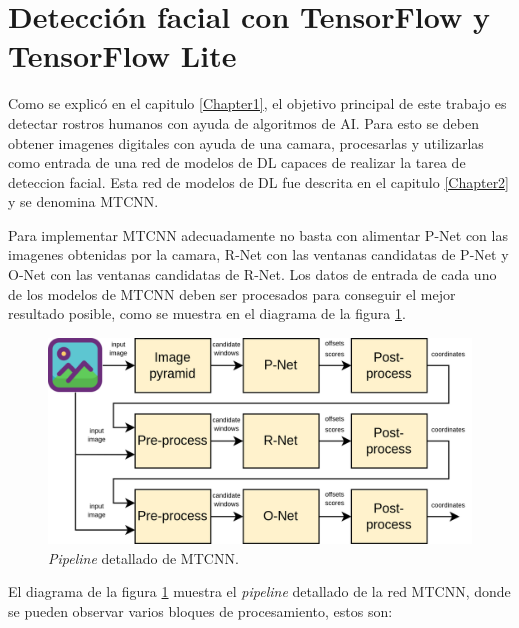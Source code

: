 \section{Detección facial con TensorFlow y TensorFlow Lite}
\label{section3_1} %
Como se explicó en el capitulo \ref{Chapter1}, el objetivo principal de este trabajo es detectar rostros humanos con ayuda de algoritmos de AI. Para esto se deben obtener imagenes digitales con ayuda de una camara, procesarlas y utilizarlas como entrada de una red de modelos de DL capaces de realizar la tarea de deteccion facial. Esta red de modelos de DL fue descrita en el capitulo \ref{Chapter2} y se denomina MTCNN.

Para implementar MTCNN adecuadamente no basta con alimentar P-Net con las imagenes obtenidas por la camara, R-Net con las ventanas candidatas de P-Net y O-Net con las ventanas candidatas de R-Net. Los datos de entrada de cada uno de los modelos de MTCNN deben ser procesados para conseguir el mejor resultado posible, como se muestra en el diagrama de la figura \ref{fig:mtcnn_npipe}.

\begin{figure}[h]
	\centering
	\includegraphics[scale=0.3]{./Figures/mtcnn_npipe.png}
	\caption{\textit{Pipeline} detallado de MTCNN.}
	\label{fig:mtcnn_npipe}
\end{figure}

El diagrama de la figura \ref{fig:mtcnn_npipe} muestra el \textit{pipeline} detallado de la red MTCNN, donde se pueden observar varios bloques de procesamiento, estos son:

